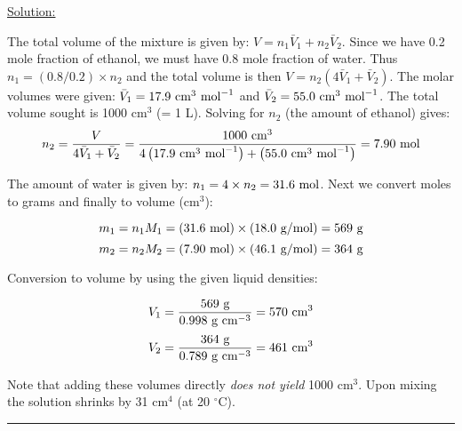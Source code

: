 \noindent
\underline{Solution:}

The total volume of the mixture is given by: $V = n_1\bar{V}_1 + n_2\bar{V}_2$. Since we have 0.2 mole fraction of ethanol, we must have 0.8 mole fraction of water. Thus $n_1 = (0.8 / 0.2)\times n_2$ and the total volume is then $V = n_2\left(4\bar{V}_1 + \bar{V}_2\right)$. The molar volumes were given: $\bar{V}_1 = 17.9\textnormal{ cm}^3\textnormal{ mol}^{-1}$ and $\bar{V}_2 = 55.0\textnormal{ cm}^3\textnormal{ mol}^{-1}$. The total volume sought is 1000 cm$^3$ (= 1 L). Solving for $n_2$ (the amount of ethanol) gives:
$$n_2 = \frac{V}{4\bar{V}_1 + \bar{V}_2} = \frac{1000\textnormal{ cm}^3}{4\left(17.9\textnormal{ cm}^3\textnormal{ mol}^{-1}\right) + \left(55.0\textnormal{ cm}^3\textnormal{ mol}^{-1}\right)} = 7.90\textnormal{ mol}$$

The amount of water is given by: $n_1 = 4\times n_2 = 31.6\textnormal{ mol}$. Next we convert moles to grams and finally to volume (cm$^3$):

$$m_1 = n_1M_1 = (31.6\textnormal{ mol})\times(18.0\textnormal{ g/mol}) = 569\textnormal{ g}$$
$$m_2 = n_2M_2 = (7.90\textnormal{ mol})\times(46.1\textnormal{ g/mol}) = 364\textnormal{ g}$$

Conversion to volume by using the given liquid densities:

$$V_1 = \frac{569\textnormal{ g}}{0.998\textnormal{ g cm}^{-3}} = 570\textnormal{ cm}^3$$
$$V_2 = \frac{364\textnormal{ g}}{0.789\textnormal{ g cm}^{-3}} = 461\textnormal{ cm}^3$$

Note that adding these volumes directly \textit{does not yield} 1000 cm$^3$. Upon mixing the solution shrinks by 31 cm$^4$ (at 20 $^\circ$C).

\hrule\vspace{0.5cm}

